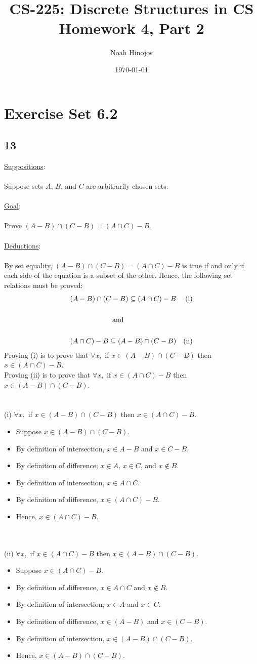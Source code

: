 \documentclass[12pt]{article}
\title{
  \textbf{CS-225: Discrete Structures in CS} \\
  Homework 4, Part 2
  }
\author{Noah Hinojos}
\date{\today}
\newcommand{\xlist}[1]{
    \begin{itemize}
        \renewcommand{\labelitemi}{$\centerdot$}
        #1
    \end{itemize}
    \newblock
    \\ \\
}
\newcommand{\xsupposition}[1]{
    \underline{Suppositions}:
    \\ \\
    #1
    \\ \\
}
\newcommand{\xgoal}[1]{
    \underline{Goal}:
    \\ \\
    #1
    \\ \\
}
\newcommand{\xdeduction}{
    \underline{Deductions}:
    \\ \\
}
\begin{document}
\maketitle

\section*{Exercise Set 6.2}
\subsection*{13}
\xsupposition{Suppose sets $A$, $B$, and $C$ are arbitrarily chosen sets.}
\xgoal{Prove $(A-B)\cap(C-B) = (A \cap C)-B$.}
\xdeduction
By set equality, $(A-B)\cap(C-B) = (A \cap C)-B$ is true if and only if each side of the equation is a subset of the other. Hence, the following set relations must be proved:
\begin{align*}
  (A-B)\cap(C-B) \subseteq (A \cap C)-B &&\text{(i)}\\
  \vspace{1mm} \\
  \text{and \hspace*{2.5cm}} \\
  \vspace{1mm} \\
  (A \cap C)-B \subseteq (A-B)\cap(C-B) &&\text{(ii)}
\end{align*}
Proving (i) is to prove that $\forall x,$ if $x \in (A-B)\cap(C-B)$ then $x \in (A \cap C)-B$. \\
Proving (ii) is to prove that $\forall x,$ if $x \in (A \cap C)-B$ then $x \in (A-B)\cap(C-B)$. \\
\\ \\
(i) $\forall x,$ if $x \in (A-B)\cap(C-B)$ then $x \in (A \cap C)-B$.
\xlist{
  \item Suppose $x \in (A-B)\cap(C-B)$.
  \item By definition of intersection, $x \in A-B$ and $x \in C-B$.
  \item By definition of difference; $x \in A$, $x \in C$, and $x \not\in B$.
  \item By definition of intersection, $x \in A \cap C$.
  \item By definition of difference, $x \in (A \cap C) - B$.
  \item Hence, $x \in (A \cap C)-B$.
}
(ii) $\forall x,$ if $x \in (A \cap C)-B$ then $x \in (A-B)\cap(C-B)$.
\xlist{
  \item Suppose $x \in (A \cap C)-B$.
  \item By definition of difference, $x \in A \cap C$ and $x \not\in B$.
  \item By definition of intersection, $x \in A$ and $x \in C$.
  \item By definition of difference, $x \in (A-B)$ and $x \in (C-B)$.
  \item By definition of intersection, $x \in (A-B)\cap(C-B)$.
  \item Hence, $x \in (A-B)\cap(C-B)$.
}
\end{document}
